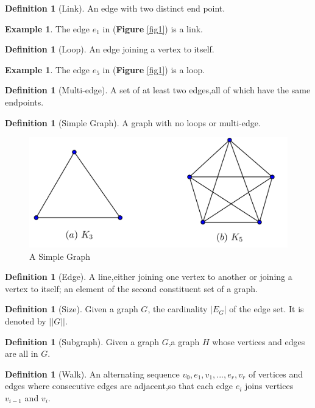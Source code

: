 \documentclass[	DIV=calc,%
							paper=a4,%
							fontsize=11pt,%
							twocolumn]{scrartcl}	 					%
\theoremstyle{definition}
\newtheorem{defn}[thm]{Definition}
\newtheorem{exmp}[thm]{Example}
\theoremstyle{plain}
\theoremstyle{remark}
\begin{document}
\begin{defn}[Link]
An edge with two distinct end point.
\end{defn}

\begin{exmp}
The edge $e_1$ in (\textbf{Figure} \ref{fig1}) is a link.
\end{exmp}

\begin{defn}[Loop]
An edge joining a vertex to itself.
\end{defn}

\begin{exmp}
The edge $e_5$ in (\textbf{Figure} \ref{fig1}) is a loop.
\end{exmp}

\begin{defn}[Multi-edge]
 A set of at least two edges,all of which have the same endpoints.
\end{defn}
\begin{defn}[Simple Graph]
A graph with no loops or multi-edge.
\end{defn}
\begin{figure}[hbt!]
\centering
\includegraphics[width=.5\textwidth]{simplegraph.png}
\caption{A Simple Graph}\label{fig2}
\end{figure}

\begin{defn}[Edge]
A line,either joining one vertex to another or joining a vertex to itself; an element of the second constituent set of a graph.
\end{defn}

\begin{defn}[Size]
Given a graph $G$, the cardinality $|E_G|$ of the edge set. It is denoted by $||G||$.
\end{defn}

\begin{defn}[Subgraph]
Given a graph $G$,a graph $H$ whose vertices and edges are all in $G$.
\end{defn}

\begin{defn}[Walk]
An alternating sequence $v_0, e_1, v_1,...,e_r, v_r$ of vertices and edges where consecutive edges are adjacent,so that each edge $e_i$ joins vertices $v_{i−1}$ and $v_i$.
\end{defn}
\end{document}
